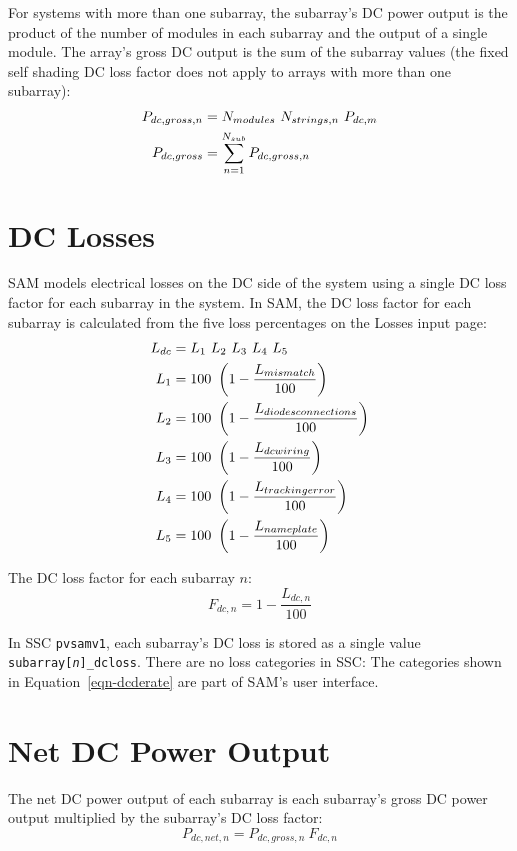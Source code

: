 \documentclass[12pt,letterpaper]{article}
\begin{document}
For systems with more than one subarray, the subarray's DC power output is the product of the number of modules in each subarray and the output of a single module. The array's gross DC output is the sum of the subarray values (the fixed self shading DC loss factor does not apply to arrays with more than one subarray):
\begin{align}
P_{dc,gross,n} &= N_{modules}~N_{strings,n}~P_{dc,m} \notag\\
P_{dc,gross} &= \sum_{n=1}^{N_{sub}} P_{dc,gross,n}
\end{align}

\section{DC Losses} \label{sec-dclosses}

SAM models electrical losses on the DC side of the system using a single DC loss factor for each subarray in the system. In SAM, the DC loss factor for each subarray is calculated from the five loss percentages on the Losses input page:
\begin{align}\label{eqn-dcderate}
L_{dc} &= L_1~L_2~L_3~L_4~L_5 \notag\\
L_{1} &= 100~\left(1-\frac{L_{mismatch}}{100}\right) \notag\\
L_{2} &= 100~\left(1-\frac{L_{diodesconnections}}{100}\right) \notag\\
L_{3} &= 100~\left(1-\frac{L_{dcwiring}}{100}\right) \notag\\
L_{4} &= 100~\left(1-\frac{L_{trackingerror}}{100}\right) \notag\\
L_{5} &= 100~\left(1-\frac{L_{nameplate}}{100}\right)
\end{align}

The DC loss factor for each subarray $n$:
\begin{equation}
F_{dc,n}=1 - \frac{L_{dc,n}}{100}
\end{equation}

In SSC \texttt{pvsamv1}, each subarray's DC loss is stored as a single value \texttt{subarray[\textit{n}]\_dcloss}. There are no loss categories in SSC: The categories shown in Equation~\ref{eqn-dcderate} are part of SAM's user interface.

\section{Net DC Power Output}

The net DC power output of each subarray is each subarray's gross DC power output multiplied by the subarray's DC loss factor:
\begin{equation}
P_{dc,net,n} = P_{dc,gross,n}~F_{dc,n}
\end{equation}
\end{document}
